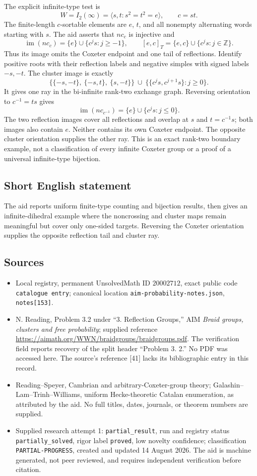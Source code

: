 \documentclass[11pt]{article}
\newcommand{\Z}{\mathbb{Z}}
\begin{document}
The explicit infinite-type test is
\[
 W=I_2(\infty)=\langle s,t:s^2=t^2=e\rangle,\qquad c=st.
\]
The finite-length \(c\)-sortable elements are \(e\), \(t\), and all nonempty alternating words starting with \(s\). The aid asserts that \(nc_c\) is injective and
\[
 \operatorname{im}(nc_c)=\{e\}\cup\{c^js:j\ge-1\},\qquad
 [e,c]_T=\{e,c\}\cup\{c^js:j\in\Z\}.
\]
Thus its image omits the Coxeter endpoint and one tail of reflections. Identify positive roots with their reflection labels and negative simples with signed labels \(-s,-t\). The cluster image is exactly
\[
 \{\{-s,-t\},\ \{-s,t\},\ \{s,-t\}\}
 \ \cup\ \{\{c^js,c^{j+1}s\}:j\ge0\}.
\]
It gives one ray in the bi-infinite rank-two exchange graph. Reversing orientation to \(c^{-1}=ts\) gives
\[
 \operatorname{im}(nc_{c^{-1}})=\{e\}\cup\{c^js:j\le0\}.
\]
The two reflection images cover all reflections and overlap at \(s\) and \(t=c^{-1}s\); both images also contain \(e\). Neither contains its own Coxeter endpoint. The opposite cluster orientation supplies the other ray. This is an exact rank-two boundary example, not a classification of every infinite Coxeter group or a proof of a universal infinite-type bijection.
\subsection{Short English statement}
The aid reports uniform finite-type counting and bijection results, then gives an infinite-dihedral example where the noncrossing and cluster maps remain meaningful but cover only one-sided targets. Reversing the Coxeter orientation supplies the opposite reflection tail and cluster ray.
\subsection{Sources}
\begin{itemize}
\item Local registry, permanent UnsolvedMath ID \(20002712\), exact public code \texttt{catalogue entry}; canonical location \texttt{aim-probability-notes.json}, \texttt{notes[153]}.
\item N. Reading, Problem 3.2 under ``3. Reflection Groups,'' AIM \emph{Braid groups, clusters and free probability}; supplied reference \url{https://aimath.org/WWN/braidgroups/braidgroups.pdf}. The verification field reports recovery of the split header ``Problem 3. 2.'' No PDF was accessed here. The source's reference [41] lacks its bibliographic entry in this record.
\item Reading--Speyer, Cambrian and arbitrary-Coxeter-group theory; Galashin--Lam--Trinh--Williams, uniform Hecke-theoretic Catalan enumeration, as attributed by the aid. No full titles, dates, journals, or theorem numbers are supplied.
\item Supplied research attempt 1: \texttt{partial\_result}, run and registry status \texttt{partially\_solved}, rigor label \texttt{proved}, low novelty confidence; classification \texttt{PARTIAL-PROGRESS}, created and updated 14 August 2026. The aid is machine generated, not peer reviewed, and requires independent verification before citation.
\end{itemize}
\end{document}
